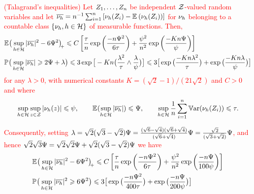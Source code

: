 \textcolor{red}{
\begin{lm}(Talagrand's inequalities)\label{re:tal} Let
  $Z_1,\dotsc,Z_n$ be independent ${\mathcal Z}$-valued random variables and let $\overline{\nu_{h}}=n^{-1}\sum_{i=1}^n\left[\nu_{h}(Z_i)-{\mathbb E}_{}\left(\nu_{h}(Z_i)\right) \right]$ for $\nu_{h}$ belonging to a countable class $\{\nu_{h},h\in{\mathcal H}\}$ of measurable functions. Then,
\begin{align}
	 &{\mathbb E}_{}{\big( \sup_{h\in{\mathcal H}}|\overline{\nu_{h}}|^2-6\Psi^2\big)_{\hspace*{-.5ex}+}}\leqslant C \left[\frac{\tau}{n}\exp\left(\frac{-n\Psi^2}{6\tau}\right)+\frac{\psi^2}{n^2}\exp\left(\frac{-K n \Psi}{\psi}\right) \right]\label{re:tal:e1} \\
	&{\mathbb P}_{}\big(\sup_{h\in{\mathcal H}}|\overline{\nu_{h}}|\geqslant2\Psi+\lambda\big)\leqslant3\exp\big[-Kn\big(\frac{\lambda^2}{\tau}\wedge\frac{\lambda}{\psi}\big)\big]\leqslant 3\big[\exp\big(\frac{-Kn\lambda^2}{\tau}\big)+\exp\big(\frac{-Kn\lambda}{\psi}\big)\big]\label{re:tal:e2}
\end{align}
for any $\lambda>0$, with numerical constants $K=({\sqrt{2}-1})/({21\sqrt{2}})$ and $C>0$ and where
\begin{equation*}
	\sup_{h\in{\mathcal H}}\sup_{z\in{\mathcal Z}}|\nu_{h}(z)|\leqslant \psi,\qquad {\mathbb E}_{}(\sup_{h\in{\mathcal H}}|\overline{\nu_{h}}|)\leqslant \Psi,\qquad \sup_{h\in{\mathcal H}}\frac{1}{n}\sum_{i=1}^n \mathop{\mathrm{\mathbb{V}ar}}\nolimits(\nu_{h}(Z_i))\leqslant \tau.
\end{equation*}
\end{lm}
\begin{rmk}
Consequently,
setting $\lambda=\sqrt{2}(\sqrt{3}-\sqrt{2})\Psi=\tfrac{(\sqrt{6}-\sqrt{4})(\sqrt{6}+\sqrt{4})}{(\sqrt{6}+\sqrt{4})}\Psi=\tfrac{\sqrt{2}}{(\sqrt{3}+\sqrt{2})}\Psi$, and hence $\sqrt{2}\sqrt{3}\Psi=\sqrt{2}\sqrt{2}\Psi+\sqrt{2}(\sqrt{3}-\sqrt{2})\Psi$ we have  
\begin{align}
	 &\Ex\vectp{\sup_{\He\in\cH}|\overline{\nu_{\He}}|^2-6\TcH^2}\leq C \left[\frac{\Tcv}{n}\exp\left(\frac{-n\TcH^2}{6\Tcv}\right)+\frac{\Tch^2}{n^2}\exp\left(\frac{-n \TcH}{100\Tch}\right) \right]\label{re:tal:e3} \\
	&\pM\big(\sup_{\He\in\cH}|\overline{\nu_{\He}}|^2\geq6\TcH^2\big)\leq 3\big[\exp\big(\frac{-n\TcH^2}{400\Tcv}\big)+\exp\big(\frac{-n\TcH}{200\Tch}\big)\big]\label{re:tal:e4}

\end{align}
\end{rmk}}
